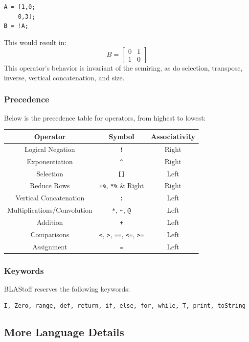 \begin{lstlisting}
A = [1,0;
    0,3];
B = !A;
\end{lstlisting}
This would result in:
$$B=\begin{bmatrix}
0 & 1\\
1 & 0
\end{bmatrix}$$
This operator's behavior is invariant of the semiring, as do selection, transpose, inverse, vertical concatenation, and size.

\subsubsection{Precedence}
Below is the precedence table for operators, from highest to lowest:
\begin{center}
\begin{tabular}{|c|c|c|}
    \hline
    Operator &  Symbol & Associativity\\
    \hline
    Logical Negation & \verb|!| & Right\\
    \hline
    Exponentiation & \verb|^| & Right\\
    \hline
    Selection & \verb|[]| & Left\\
    \hline
    Reduce Rows & \verb|+%|, \verb|*%| & Right\\
    \hline
    Vertical Concatenation & \verb|:| & Left\\
    \hline
    Multiplications/Convolution &  \verb|*|, \verb|~|, \verb|@| & Left\\
    \hline
    Addition &  \verb|+| & Left\\
    \hline
    Comparisons &  \verb|<|, \verb|>|, \verb|==|, \verb|<=|, \verb|>=|  & Left\\
    \hline
    Assignment &  \verb|=|  & Left\\
    \hline
\end{tabular}
\end{center}

\subsubsection{Keywords}
BLAStoff reserves the following keywords:
\begin{verbatim}
I, Zero, range, def, return, if, else, for, while, T, print, toString
\end{verbatim}

\subsection{More Language Details}
